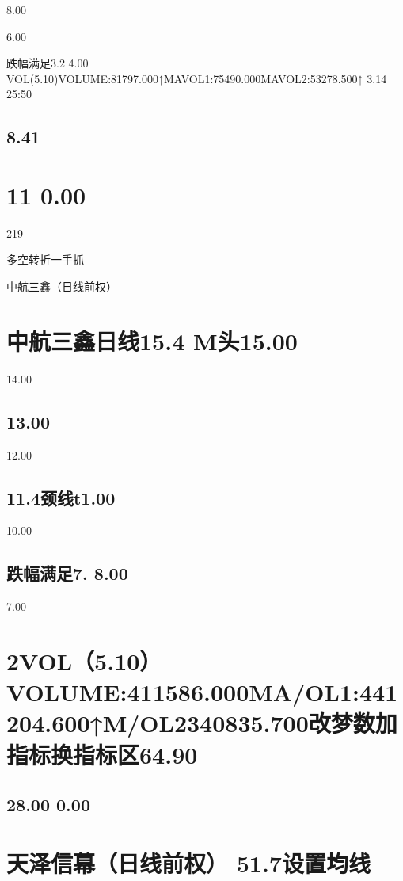 \documentclass{article}
\begin{document}
8.00

6.00

跌幅满足3.2 4.00 VOL(5.10)VOLUME:81797.000↑MAVOL1:75490.000MAVOL2:53278.500↑ 3.14 25:50

\subsection{8.41}

\section{11 0.00}

219

\clearpage

多空转折一手抓

中航三鑫（日线前权）

\section{中航三鑫日线15.4 M头15.00}

14.00

\subsection{13.00}

12.00

\subsection{11.4颈线t1.00}

10.00

\subsection{跌幅满足7. 8.00}

7.00

\section{2VOL（5.10）VOLUME:411586.000MA/OL1:441204.600↑M/OL2340835.700改梦数加指标换指标区64.90}

\subsection{28.00 0.00}

\section{天泽信幕（日线前权） 51.7设置均线}
\end{document}
